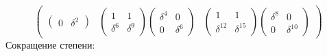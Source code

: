 \[\begin{pmatrix}
\begin{pmatrix}
            0 & \delta^2
        \end{pmatrix}
         &
        \begin{pmatrix}
            1        & 1        \\
            \delta^6 & \delta^9
        \end{pmatrix}
        \begin{pmatrix}
            \delta^4 & 0        \\
            0        & \delta^6
        \end{pmatrix}
         &
        \begin{pmatrix}
            1           & 1           \\
            \delta^{12} & \delta^{15}
        \end{pmatrix}
        \begin{pmatrix}
            \delta^8 & 0           \\
            0        & \delta^{10}
        \end{pmatrix}
    \end{pmatrix}
\]
Сокращение степени:
